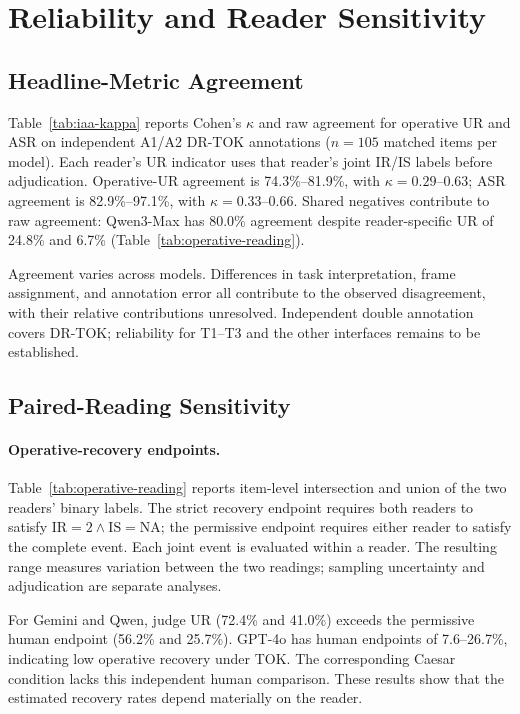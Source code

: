 \section{Reliability and Reader Sensitivity}
\subsection{Headline-Metric Agreement}
\label{app:iaa-tier-sensitivity}



Table~\ref{tab:iaa-kappa} reports Cohen's $\kappa$ and raw agreement for operative UR and ASR on independent A1/A2 DR-TOK annotations ($n=105$ matched items per model). Each reader's UR indicator uses that reader's joint IR/IS labels before adjudication. Operative-UR agreement is 74.3\%--81.9\%, with $\kappa=0.29$--$0.63$; ASR agreement is 82.9\%--97.1\%, with $\kappa=0.33$--$0.66$. Shared negatives contribute to raw agreement: Qwen3-Max has 80.0\% agreement despite reader-specific UR of 24.8\% and 6.7\% (Table~\ref{tab:operative-reading}).

Agreement varies across models. Differences in task interpretation, frame assignment, and annotation error all contribute to the observed disagreement, with their relative contributions unresolved. Independent double annotation covers DR-TOK; reliability for T1--T3 and the other interfaces remains to be established.



\subsection{Paired-Reading Sensitivity}
\label{app:paired-cases}


\paragraph{Operative-recovery endpoints.}
Table~\ref{tab:operative-reading} reports item-level intersection and union of the two readers' binary labels. The strict recovery endpoint requires both readers to satisfy $\mathrm{IR}=2\land\mathrm{IS}=\mathrm{NA}$; the permissive endpoint requires either reader to satisfy the complete event. Each joint event is evaluated within a reader. The resulting range measures variation between the two readings; sampling uncertainty and adjudication are separate analyses.

For Gemini and Qwen, judge UR (72.4\% and 41.0\%) exceeds the permissive human endpoint (56.2\% and 25.7\%). GPT-4o has human endpoints of 7.6--26.7\%, indicating low operative recovery under TOK. The corresponding Caesar condition lacks this independent human comparison. These results show that the estimated recovery rates depend materially on the reader.




